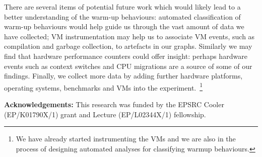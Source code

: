 \documentclass[preprint]{sigplanconf}
\begin{document}
There are several items of potential future work which would likely lead to a
better understanding of the warm-up behaviours: automated classification of
warm-up behaviours would help guide us through the vast amount of data we have
collected; VM instrumentation may
help us to associate VM events, such as compilation and garbage collection, to
artefacts in our graphs. Similarly we may find that hardware performance
counters could offer insight: perhaps hardware events such as context
switches and CPU migrations are a source of some of our findings. Finally, we
collect more data by adding further hardware platforms, operating systems,
benchmarks and VMs into the experiment.~\footnote{We have already started
instrumenting the VMs and we are also in the process of designing automated
analyses for classifying warmup behaviours.}

\textbf{Acknowledgements:} This research was funded by the EPSRC Cooler
(EP/K01790X/1) grant and Lecture (EP/L02344X/1) fellowship.



\end{document}
